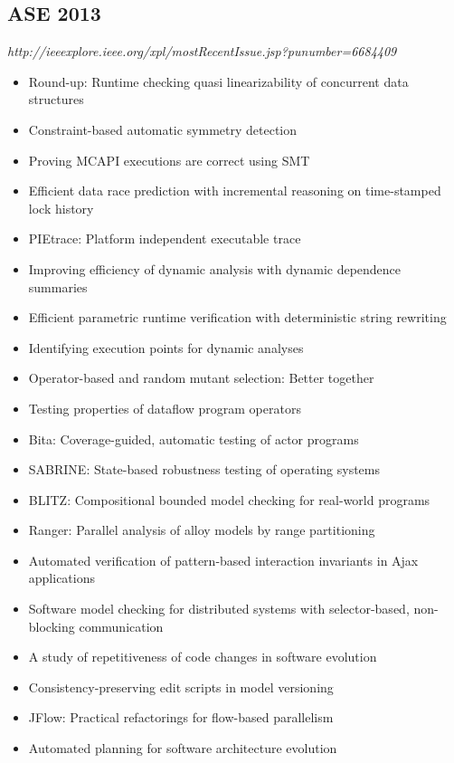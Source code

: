 \subsection{ASE 2013}

{\small \em http://ieeexplore.ieee.org/xpl/mostRecentIssue.jsp?punumber=6684409}

{\small
\begin{itemize}[itemsep=-1ex]
  \item Round-up: Runtime checking quasi linearizability of concurrent data structures
  \item Constraint-based automatic symmetry detection
  \item Proving MCAPI executions are correct using SMT
  \item Efficient data race prediction with incremental reasoning on time-stamped lock history
  \item PIEtrace: Platform independent executable trace
  \item Improving efficiency of dynamic analysis with dynamic dependence summaries
  \item Efficient parametric runtime verification with deterministic string rewriting
  \item Identifying execution points for dynamic analyses
  \item Operator-based and random mutant selection: Better together
  \item Testing properties of dataflow program operators
  \item Bita: Coverage-guided, automatic testing of actor programs
  \item SABRINE: State-based robustness testing of operating systems
  \item BLITZ: Compositional bounded model checking for real-world programs
  \item Ranger: Parallel analysis of alloy models by range partitioning
  \item Automated verification of pattern-based interaction invariants in Ajax applications
  \item Software model checking for distributed systems with selector-based, non-blocking communication
  \item A study of repetitiveness of code changes in software evolution
  \item Consistency-preserving edit scripts in model versioning
  \item JFlow: Practical refactorings for flow-based parallelism
  \item Automated planning for software architecture evolution

\end{itemize}}
